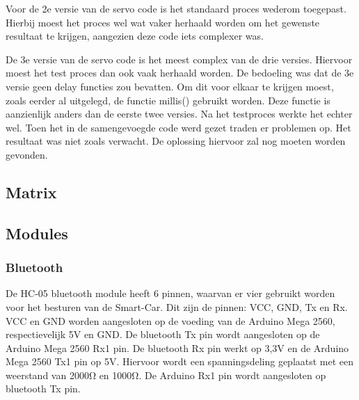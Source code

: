 Voor de 2e versie van de servo code is het standaard proces wederom toegepast. Hierbij moest het proces wel wat vaker herhaald worden om het gewenste resultaat te krijgen, aangezien deze code iets complexer was. 

De 3e versie van de servo code is het meest complex van de drie versies. Hiervoor moest het test proces dan ook vaak herhaald worden. De bedoeling was dat de 3e versie geen delay functies zou bevatten. Om dit voor elkaar te krijgen moest, zoals eerder al uitgelegd, de functie millis() gebruikt worden. Deze functie is aanzienlijk anders dan de eerste twee versies. Na het testproces werkte het echter wel. Toen het in de samengevoegde code werd gezet traden er problemen op. Het resultaat was niet zoals verwacht. De oplossing hiervoor zal nog moeten worden gevonden. 

\subsection{Matrix}
\subsection{Modules}
\subsubsection{Bluetooth}
De HC-05 bluetooth module heeft 6 pinnen, waarvan er vier gebruikt worden voor het besturen van de \gls{Smart-Car}. Dit zijn de pinnen: VCC, GND, \gls{Tx en Rx}. VCC en GND worden aangesloten op de voeding van de Arduino Mega 2560, respectievelijk 5V en GND.  De bluetooth Tx pin wordt aangesloten op de Arduino Mega 2560 Rx1 pin. De bluetooth Rx pin werkt op 3,3V en de Arduino Mega 2560 Tx1 pin op 5V. Hiervoor wordt een spanningsdeling geplaatst met een weerstand van 2000\si{\ohm} en 1000\si{\ohm}. De Arduino Rx1 pin wordt aangesloten op bluetooth Tx pin.

